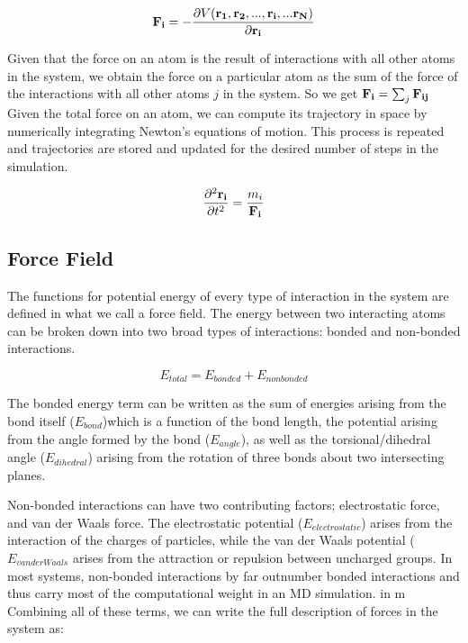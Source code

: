 \begin{equation}
\mathbf{F_i}  = -\frac{\partial V(\mathbf{r_1}, \mathbf{r_2}, ..., \mathbf{r_i}, ... \mathbf{r_N)}}{\partial \mathbf{r_i}}
 \end{equation}
 
 Given that the force on an atom is the result of interactions with all other atoms in the system, we obtain the force on a particular atom as the sum of the force of the interactions with all other atoms $j$ in the system. So we get $\mathbf{F_i} = \sum_{j} \mathbf{F_{ij}}$ Given the total force on an atom, we can compute its trajectory in space by numerically integrating Newton's equations of motion. This process is repeated and trajectories are stored and updated for the desired number of steps in the simulation.
 
 \begin{equation}
 \frac{\partial^2 \mathbf{r_{i}}}{\partial t^2} = \frac{m_i}{\mathbf{F_i}}
\end{equation}

\subsection{Force Field}

The functions for potential energy of every type of interaction in the system are defined in what we call a force field. The energy between two interacting atoms can be broken down into two broad types of interactions: bonded and non-bonded interactions.

\begin{equation}
E_{total} = E_{bonded} + E_{non bonded}
\end{equation}

The bonded energy term can be written as the sum of energies arising from the bond itself  ($E_{bond}$)which is a function of the bond length, the potential arising from the angle formed by the bond ($E_{angle}$), as well as the torsional/dihedral angle ($E_{dihedral}$) arising from the rotation of three bonds about two intersecting planes.

Non-bonded interactions can have two contributing factors; electrostatic force, and van der Waals force. The electrostatic potential ($E_{electrostatic}$) arises from the interaction of the charges of particles, while the van der Waals potential  ($E_{van der Waals}$ arises from the attraction or repulsion between uncharged groups. In most systems, non-bonded interactions by far outnumber bonded interactions and thus carry most of the computational weight in an MD simulation. in m Combining all of these terms, we can write the full description of forces in the system as:

